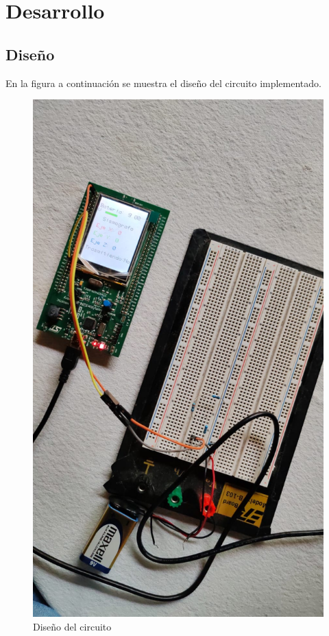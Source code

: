 \section{Desarrollo}

\subsection{Diseño}





En la figura a continuación se muestra el diseño del circuito implementado.

\begin{figure}[H]
    \centering
    \includegraphics[scale=0.2]{images/lab4.jpeg}
    \caption{Diseño del circuito}
    \label{fig:circuito}
\end{figure}


